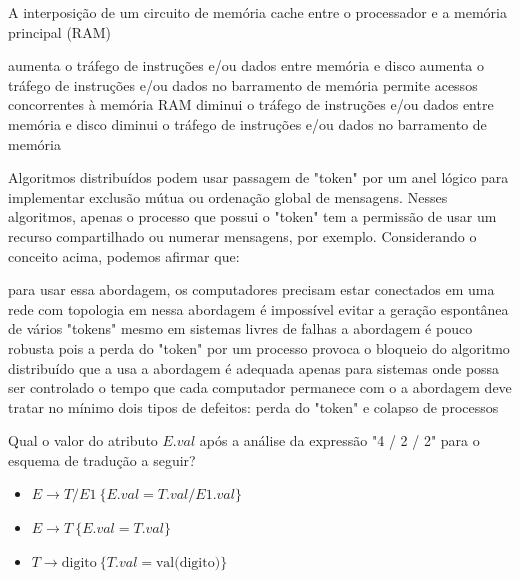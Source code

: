 \documentclass[12pt, addpoints]{exam}
\begin{document}
\begin{questions}
A interposição de um circuito de memória cache entre o processador e a memória principal (RAM)
\begin{choices}
\choice aumenta o tráfego de instruções e/ou dados entre memória e disco
\choice aumenta o tráfego de instruções e/ou dados no barramento de memória
\choice permite acessos concorrentes à memória RAM
\choice diminui o tráfego de instruções e/ou dados entre memória e disco
\choice diminui o tráfego de instruções e/ou dados no barramento de memória
\end{choices}

\question

Algoritmos distribuídos podem usar passagem de "token" por um anel lógico para implementar exclusão mútua ou ordenação global de mensagens. Nesses algoritmos, apenas o processo que possui o "token" tem a permissão de usar um recurso compartilhado ou numerar mensagens, por exemplo. Considerando o conceito acima, podemos afirmar que: 
\begin{choices}
\choice para usar essa abordagem, os computadores precisam estar conectados em uma rede com topologia em 
\choice nessa abordagem é impossível evitar a geração espontânea de vários "tokens" mesmo em sistemas livres de falhas 
\choice a abordagem é pouco robusta pois a perda do "token" por um processo provoca o bloqueio do algoritmo distribuído que a usa 
\choice a abordagem é adequada apenas para sistemas onde possa ser controlado o tempo que cada computador permanece com o 
\choice a abordagem deve tratar no mínimo dois tipos de defeitos: perda do "token" e colapso de processos 
\end{choices}

\question

Qual o valor do atributo \( E.val \) após a análise da expressão "4 / 2 / 2" para o esquema de tradução a seguir?



\begin{itemize}

    \item \( E \rightarrow T / E1 \ \{ E.val = T.val / E1.val \} \)

    \item \( E \rightarrow T \ \{ E.val = T.val \} \)

    \item \( T \rightarrow \text{digito} \ \{ T.val = \text{val(digito)} \} \)

\end{itemize}



\end{questions}
\end{document}
